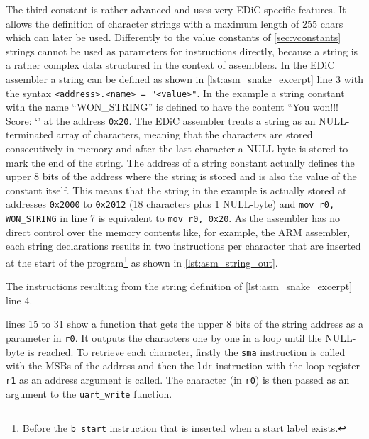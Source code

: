 The third constant is rather advanced and uses very \gls{EDiC} specific features.
It allows the definition of character strings with a maximum length of 255 chars which can later be used.
Differently to the value constants of \cref{sec:vconstants} strings cannot be used as parameters for instructions directly, because a string is a rather complex data structured in the context of assemblers.
In the \gls{EDiC} assembler a string can be defined as shown in \cref{lst:asm_snake_excerpt} line 3 with the syntax \texttt{<address>.<name> = "<value>"}.
In the example a string constant with the name ``WON\_STRING'' is defined to have the content ``You won!!! Score: `' at the address \texttt{0x20}.
The \gls{EDiC} assembler treats a string as an NULL-terminated array of characters, meaning that the characters are stored consecutively in memory and after the last character a NULL-byte is stored to mark the end of the string.
The address of a string constant actually defines the upper 8 bits of the address where the string is stored and is also the value of the constant itself.
This means that the string in the example is actually stored at addresses \texttt{0x2000} to \texttt{0x2012} (18 characters plus 1 NULL-byte) and \texttt{mov r0, WON_STRING} in line 7 is equivalent to \texttt{mov r0, 0x20}.
As the assembler has no direct control over the memory contents like, for example, the ARM assembler, each string declarations results in two instructions per character that are inserted at the start of the program\footnote{Before the \texttt{b start} instruction that is inserted when a start label exists.} as shown in \cref{lst:asm_string_out}.

\begin{listing}[t]
  \caption{The instructions resulting from the string definition of \cref{lst:asm_snake_excerpt} line 4.}
  \label{lst:asm_string_out}
\end{listing}
 lines 15 to 31 show a function that gets the upper 8 bits of the string address as a parameter in \texttt{r0}.
It outputs the characters one by one in a loop until the NULL-byte is reached.
To retrieve each character, firstly the \texttt{sma} instruction is called with the \glspl{MSB} of the address and then the \texttt{ldr} instruction with the loop register \texttt{r1} as an address argument is called.
The character (in \texttt{r0}) is then passed as an argument to the \texttt{uart\_write} function.

